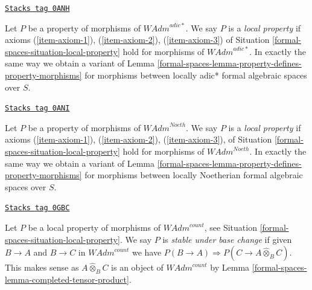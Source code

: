 \begin{remark}

\label{formal-spaces-remark-variant-adic-star}
\href{https://stacks.math.columbia.edu/tag/0ANH}{\texttt{Stacks tag 0ANH}}

Let $P$ be a property of morphisms of $\textit{WAdm}^{adic*}$.
We say $P$ is a {\it local property} if axioms
(\ref{item-axiom-1}), (\ref{item-axiom-2}), (\ref{item-axiom-3})
of Situation \ref{formal-spaces-situation-local-property}
hold for morphisms of $\textit{WAdm}^{adic*}$. In exactly the same way
we obtain a variant of Lemma \ref{formal-spaces-lemma-property-defines-property-morphisms}
for morphisms between locally adic* formal algebraic spaces over $S$.
\end{remark}

\begin{remark}

\label{formal-spaces-remark-variant-Noetherian}
\href{https://stacks.math.columbia.edu/tag/0ANI}{\texttt{Stacks tag 0ANI}}

Let $P$ be a property of morphisms of $\textit{WAdm}^{Noeth}$.
We say $P$ is a {\it local property} if axioms
(\ref{item-axiom-1}), (\ref{item-axiom-2}), (\ref{item-axiom-3}),
of Situation \ref{formal-spaces-situation-local-property}
hold for morphisms of $\textit{WAdm}^{Noeth}$. In exactly the same way
we obtain a variant of Lemma \ref{formal-spaces-lemma-property-defines-property-morphisms}
for morphisms between locally Noetherian formal algebraic spaces over $S$.
\end{remark}

\begin{definition}
\label{formal-spaces-situation-base-change-local-property}
\href{https://stacks.math.columbia.edu/tag/0GBC}{\texttt{Stacks tag 0GBC}}

Let $P$ be a local property of morphisms of $\textit{WAdm}^{count}$, see
Situation \ref{formal-spaces-situation-local-property}. We say $P$ is {\it stable under
base change} if given $B \to A$ and $B \to C$ in $\textit{WAdm}^{count}$
we have $P(B \to A) \Rightarrow P(C \to A \widehat{\otimes}_B C)$.
This makes sense as $A \widehat{\otimes}_B C$ is an object of
$\textit{WAdm}^{count}$ by Lemma \ref{formal-spaces-lemma-completed-tensor-product}.
\end{definition}

